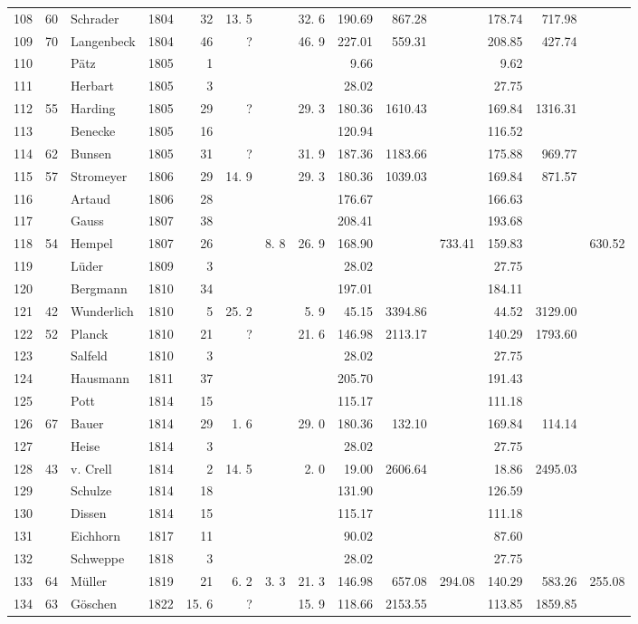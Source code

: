 \begin{center}
\begin{tabular}{|r|r|l|r|r|r|r|r|r|r|r|r|r|r|}
108&60&Schrader&1804&32&13. 5&&32. 6&190.69&867.28&&178.74&717.98&\\
109&70&Langenbeck&1804&46&?&&46. 9&227.01&559.31&&208.85&427.74&\\
110&&Pätz&1805&1&&&&9.66&&&9.62&&\\[3pt]
111&&Herbart&1805&3&&&&28.02&&&27.75&&\\
112&55&Harding&1805&29&?&&29. 3&180.36&1610.43&&169.84&1316.31&\\
113&&Benecke&1805&16&&&&120.94&&&116.52&&\\
114&62&Bunsen&1805&31&?&&31. 9&187.36&1183.66&&175.88&969.77&\\
115&57&Stromeyer&1806&29&14. 9&&29. 3&180.36&1039.03&&169.84&871.57&\\
116&&Artaud&1806&28&&&&176.67&&&166.63&&\\
117&&Gauss&1807&38&&&&208.41&&&193.68&&\\
118&54&Hempel&1807&26&&8. 8&26. 9&168.90&&733.41&159.83&&630.52\\
119&&Lüder&1809&3&&&&28.02&&&27.75&&\\
120&&Bergmann&1810&34&&&&197.01&&&184.11&&\\[3pt]
121&42&Wunderlich&1810&5&25. 2&&5. 9&45.15&3394.86&&44.52&3129.00&\\
122&52&Planck&1810&21&?&&21. 6&146.98&2113.17&&140.29&1793.60&\\
123&&Salfeld&1810&3&&&&28.02&&&27.75&&\\
124&&Hausmann&1811&37&&&&205.70&&&191.43&&\\
125&&Pott&1814&15&&&&115.17&&&111.18&&\\
126&67&Bauer&1814&29&1. 6&&29. 0&180.36&132.10&&169.84&114.14&\\
127&&Heise&1814&3&&&&28.02&&&27.75&&\\
128&43&v. Crell&1814&2&14. 5&&2. 0&19.00&2606.64&&18.86&2495.03&\\
129&&Schulze&1814&18&&&&131.90&&&126.59&&\\
130&&Dissen&1814&15&&&&115.17&&&111.18&&\\[3pt]
131&&Eichhorn&1817&11&&&&90.02&&&87.60&&\\
132&&Schweppe&1818&3&&&&28.02&&&27.75&&\\
133&64&Müller&1819&21&6. 2&3. 3&21. 3&146.98&657.08&294.08&140.29&583.26&255.08\\
134&63&Göschen&1822&15. 6&?&&15. 9&118.66&2153.55&&113.85&1859.85&\\\hline
\end{tabular}
\end{center}
